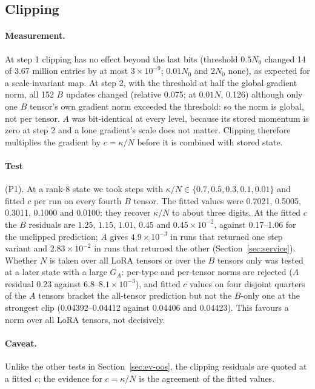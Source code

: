 \documentclass[11pt]{article}
\begin{document}
\subsection{Clipping}\label{sec:ev-clip}
\paragraph{Measurement.} At step 1 clipping has no effect beyond the last bits (threshold $0.5N_0$
changed 14 of 3.67 million entries by at most $3\times10^{-9}$; $0.01N_0$ and $2N_0$ none), as
expected for a scale-invariant map. At step 2, with the threshold at half the global gradient norm,
all 152 $B$ updates changed (relative 0.075; at $0.01N$, 0.126) although only one $B$ tensor's own
gradient norm exceeded the threshold: so the norm is global, not per tensor. $A$ was bit-identical at
every level, because its stored momentum is zero at step 2 and a lone gradient's scale does not
matter. Clipping therefore multiplies the gradient by $c=\kappa/N$ before it is combined with stored
state.

\paragraph{Test} (P1). At a rank-8 state we took steps with $\kappa/N\in\{0.7,0.5,0.3,0.1,0.01\}$
and fitted $c$ per run on every fourth $B$ tensor. The fitted values were 0.7021, 0.5005, 0.3011,
0.1000 and 0.0100: they recover $\kappa/N$ to about three digits. At the fitted $c$ the $B$ residuals
are $1.25$, $1.15$, $1.01$, $0.45$ and $0.45\times10^{-2}$, against 0.17--1.06 for the unclipped
prediction; $A$ gives $4.9\times10^{-3}$ in runs that returned one step variant and $2.83\times10^{-2}$
in runs that returned the other (Section~\ref{sec:service}). Whether $N$ is taken over all LoRA
tensors or over the $B$ tensors only was tested at a later state with a large $G_A$: per-type and
per-tensor norms are rejected ($A$ residual 0.23 against $6.8$--$8.1\times10^{-3}$), and fitted $c$
values on four disjoint quarters of the $A$ tensors bracket the all-tensor prediction but not the
$B$-only one at the strongest clip (0.04392--0.04412 against 0.04406 and 0.04423). This favours a
norm over all LoRA tensors, not decisively.

\paragraph{Caveat.} Unlike the other tests in Section~\ref{sec:ev-oos}, the clipping residuals are
quoted at a fitted $c$; the evidence for $c=\kappa/N$ is the agreement of the fitted values.
\end{document}
